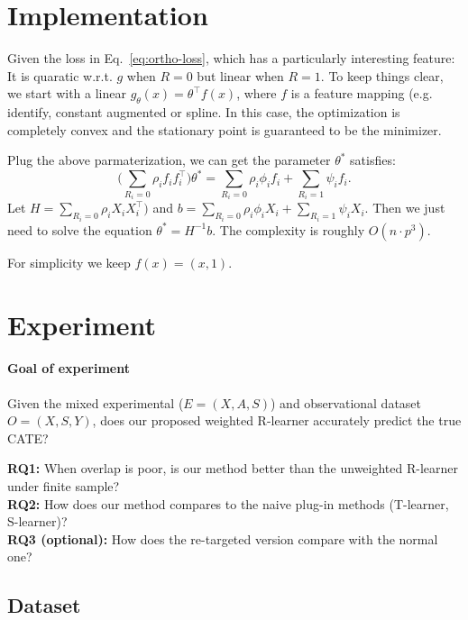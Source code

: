 \documentclass{article} %
\theoremstyle{plain} %
\theoremstyle{definition} %
\theoremstyle{remark} %
\begin{document}
\section{Implementation}
Given the loss in Eq.~\ref{eq:ortho-loss}, which has a particularly interesting feature: It is quaratic w.r.t. $g$ when $R=0$ but linear when $R=1$. To keep things clear, we start with a linear $g_\theta(x) = \theta^\top f(x)$, where $f$ is a feature mapping (e.g. identify, constant augmented or spline. In this case, the optimization is completely convex and the stationary point is guaranteed to be the minimizer. 

Plug the above parmaterization, we can get the parameter $\theta^*$ satisfies:
\begin{equation}
    \bigl(\sum_{R_i=0}\rho_i f_if_i^\top\bigr)\theta^* = \sum_{R_i=0}\rho_i\phi_i f_i + \sum_{R_i=1}\psi_i f_i.
\end{equation}
Let $H = \sum_{R_i=0}\rho_i X_iX_i^\top)$ and $b = \sum_{R_i=0}\rho_i\phi_i X_i + \sum_{R_i=1}\psi_i X_i.$ Then we just need to solve the equation $\theta^* = H^{-1}b$. The complexity is roughly $O(n\cdot p^3)$. 

For simplicity we keep $f(x) = (x, 1).$




\section{Experiment}
\paragraph{Goal of experiment}
Given the mixed experimental ($E=(X,A,S)$) and observational dataset $O=(X,S,Y)$, does our proposed weighted R-learner accurately predict the true CATE?

\textbf{RQ1:} When overlap is poor, is our method better than the unweighted R-learner under finite sample?\\
\textbf{RQ2:} How does our method compares to the naive plug-in methods (T-learner, S-learner)? \\
\textbf{RQ3 (optional):} How does the re-targeted version compare with the normal one?

\subsection{Dataset}
\end{document}
